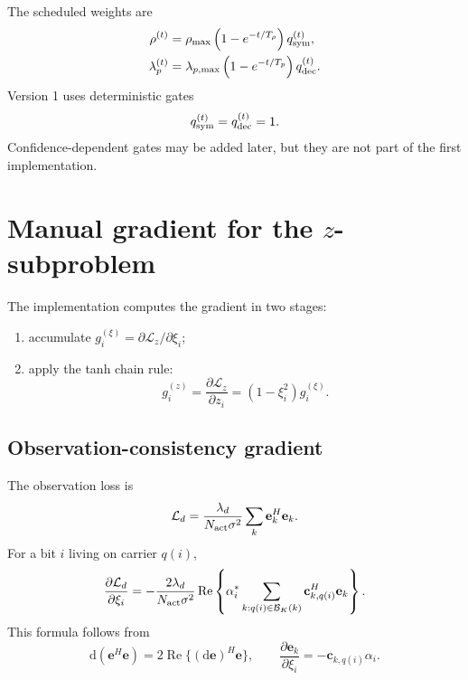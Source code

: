 \documentclass[11pt]{article}
\newcommand{\dd}{\mathrm{d}}
\newcommand{\re}{\operatorname{Re}}
\begin{document}
The scheduled weights are
\begin{align}
\rho^{(t)}&=\rho_{\max}\left(1-e^{-t/T_\rho}\right)q_{\rm sym}^{(t)},\\
\lambda_p^{(t)}&=\lambda_{p,\max}\left(1-e^{-t/T_p}\right)q_{\rm dec}^{(t)}.
\end{align}
Version 1 uses deterministic gates
\begin{equation}
q_{\rm sym}^{(t)}=q_{\rm dec}^{(t)}=1.
\end{equation}
Confidence-dependent gates may be added later, but they are not part of the first implementation.

\section{Manual gradient for the $z$-subproblem}
\label{sec:z-gradient}

The implementation computes the gradient in two stages:
\begin{enumerate}[label=(\alph*)]
\item accumulate $g_i^{(\xi)}=\partial\mathcal L_z/\partial\xi_i$;
\item apply the tanh chain rule:
\begin{equation}
 g_i^{(z)}=\frac{\partial\mathcal L_z}{\partial z_i}
 =\left(1-\xi_i^2\right)g_i^{(\xi)}.
\end{equation}
\end{enumerate}

\subsection{Observation-consistency gradient}

The observation loss is
\begin{equation}
\mathcal L_d
=\frac{\lambda_d}{N_{\rm act}\sigma^2}
\sum_k \mathbf e_k^H\mathbf e_k.
\end{equation}
For a bit $i$ living on carrier $q(i)$,
\begin{equation}
\frac{\partial \mathcal L_d}{\partial \xi_i}
= -\frac{2\lambda_d}{N_{\rm act}\sigma^2}
\re\left\{
\alpha_i^*\sum_{k:q(i)\in\mathcal B_K(k)}
\mathbf c_{k,q(i)}^H\mathbf e_k
\right\}.
\label{eq:grad_obs}
\end{equation}
This formula follows from
\begin{equation}
\dd\left(\mathbf e^H\mathbf e\right)=2\re\{(\dd\mathbf e)^H\mathbf e\},
\qquad
\frac{\partial\mathbf e_k}{\partial\xi_i}=-\mathbf c_{k,q(i)}\alpha_i.
\end{equation}
\end{document}
